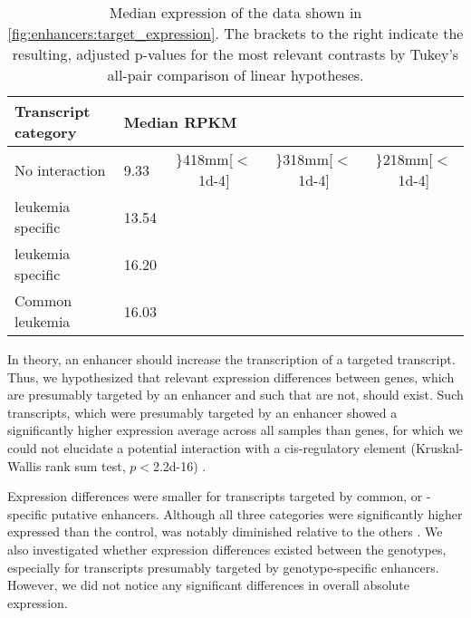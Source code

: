 \begin{table}[!thb]
	\centering
	\begin{tabular}{lp{12mm}ccc}
		\textbf{Transcript category} & \multicolumn{4}{l}{\textbf{Median RPKM}}\\
		\hline
		No interaction & \num{9.33} & \rdelim\}{4}{18mm}[\parbox{18mm}{$<$\num{1d-4}}] & \rdelim\}{3}{18mm}[\parbox{18mm}{$<$\num{1d-4}}] & \rdelim\}{2}{18mm}[\parbox{18mm}{$<$\num{1d-4}}] \\
		\dnmtwt \kitpos leukemia specific & \num{13.54} \\
		\dnmtchip \kitpos leukemia specific & \num{16.20} & \\
		Common \kitpos leukemia & \num{16.03} & & \\
		\hline
	\end{tabular}
	\caption{Median expression of the data shown in \autoref{fig:enhancers:target_expression}. The brackets to the right indicate the resulting, adjusted p-values for the most relevant contrasts by Tukey's all-pair comparison of linear hypotheses.}
	\label{tab:enhancers:targets}
\end{table} 

In theory, an enhancer should increase the transcription of a targeted transcript. Thus, we hypothesized that relevant expression differences between genes, which are presumably targeted by an enhancer and such that are not, should exist. Such transcripts, which were presumably targeted by an enhancer showed a significantly higher expression average across all samples than genes, for which we could not elucidate a potential interaction with a cis-regulatory element (Kruskal-Wallis rank sum test, $p<$\num{2.2d-16}) . 

Expression differences were smaller for transcripts targeted by common,  \dnmtwt or \dnmtchip-specific putative enhancers. Although all three categories were significantly higher expressed than the control, \dnmtwt was notably diminished relative to the others . We also investigated whether expression differences existed between the genotypes, especially for transcripts presumably targeted by genotype-specific enhancers. However, we did not notice any significant differences in overall absolute expression\dns. 

